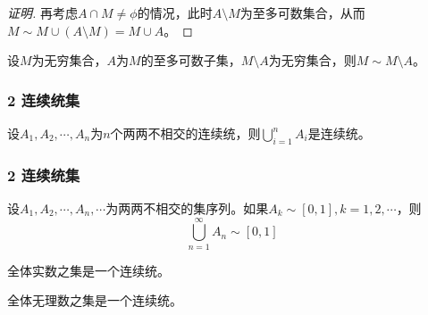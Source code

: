 \documentclass{beamer}
\begin{document}
\begin{CJK*}{UTF8}{gbsn}
\begin{frame}[t]
\begin{proof}[证明]
    再考虑$A\cap M\neq \phi$的情况，此时$A\setminus M$为至多可数集合，从而$M\sim M\cup(A\setminus M)=M\cup A$。
  \end{proof}
\end{frame}

\begin{frame}[t]
  \begin{Thm}
    设$M$为无穷集合，$A$为$M$的至多可数子集，$M\setminus A$为无穷集合，则$M \sim M\setminus A$。
  \end{Thm}
\end{frame}
\begin{frame}[t]
  \frametitle{2 连续统集}
  \begin{Thm}
    设$A_1, A_2, \cdots, A_n$为$n$个两两不相交的连续统，则$\bigcup_{i=1}^nA_i$是连续统。
  \end{Thm}
\end{frame}

\begin{frame}
  \frametitle{2 连续统集}
  \begin{Thm}
    设$A_1, A_2, \cdots, A_n, \cdots$为两两不相交的集序列。如果$A_k \sim [0,1], k = 1, 2, \cdots$，则
    \[\bigcup_{n=1}^{\infty}A_n \sim [0,1]\]
  \end{Thm}\pause
  \begin{Cor}
    全体实数之集是一个连续统。
  \end{Cor}\pause
  \begin{Cor}
    全体无理数之集是一个连续统。
  \end{Cor}
\end{frame}



\end{CJK*}
\end{document}
